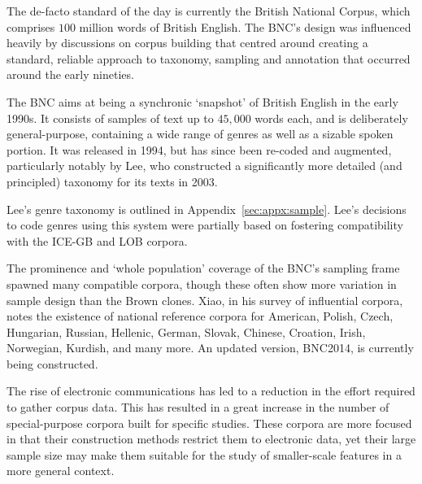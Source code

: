 




The de-facto standard of the day is currently the British National Corpus, which comprises $100$ million words of British English\cite{leech1993100}.  The BNC's design was influenced heavily by discussions on corpus building that centred around creating a standard, reliable approach to taxonomy, sampling and annotation that occurred around the early nineties.

The BNC aims at being a synchronic `snapshot' of British English in the early 1990s.  It consists of samples of text up to $45,000$ words each, and is deliberately general-purpose, containing a wide range of genres as well as a sizable spoken portion.  It was released in 1994, but has since been re-coded and augmented, particularly notably by Lee\cite{lee2003bnc}, who constructed a significantly more detailed (and principled) taxonomy for its texts in 2003.

Lee's genre taxonomy is outlined in Appendix~\ref{sec:appx:sample}.  Lee's decisions to code genres using this system were partially based on fostering compatibility with the ICE-GB\cite{greenbaum1996international} and LOB\cite{johansson1986tagged} corpora.

The prominence and `whole population' coverage of the BNC's sampling frame spawned many compatible corpora, though these often show more variation in sample design than the Brown clones.  Xiao, in his survey of influential corpora, notes the existence of national reference corpora for American, Polish, Czech, Hungarian, Russian, Hellenic, German, Slovak, Chinese, Croation, Irish, Norwegian, Kurdish, and many more\cite{xiaoz2008}.  An updated version, BNC2014\cite{cambridgeuniversitypress2014}, is currently being constructed.

% 


The rise of electronic communications has led to a reduction in the effort required to gather corpus data.  This has resulted in a great increase in the number of special-purpose corpora built for specific studies\cite{westlabusenet2013,baroni2006building,Mair20060101T00000009215034355}.  These corpora are more focused in that their construction methods restrict them to electronic data, yet  their large sample size may make them suitable for the study of smaller-scale features in a more general context.


